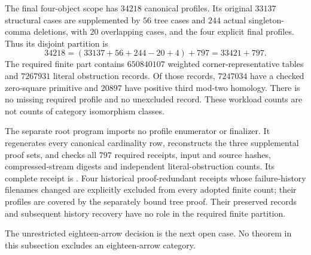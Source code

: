 The final four-object scope has $34218$ canonical profiles.
Its original $33137$ structural cases are supplemented
by $56$ tree cases and $244$ actual singleton-comma
deletions, with $20$ overlapping cases, and the four
explicit final profiles. Thus its disjoint partition is
\[
34218=(33137+56+244-20+4)+797=33421+797.
\]
The required finite part contains $650840107$ weighted
corner-representative tables and $7267931$ literal
obstruction records. Of those records, $7247034$ have
a checked zero-square primitive and $20897$ have positive
third mod-two homology. There is no missing required
profile and no unexcluded record. These workload counts
are not counts of category isomorphism classes.

The separate root program
 imports no profile
enumerator or finalizer. It regenerates every canonical
cardinality row, reconstructs the three supplemental proof
sets, and checks all $797$ required receipts, input and
source hashes, compressed-stream digests and independent
literal-obstruction counts. Its complete receipt is
. Four historical
proof-redundant receipts whose failure-history filenames
changed are explicitly excluded from every adopted finite
count; their profiles are covered by the separately bound
tree proof. Their preserved records and subsequent history
recovery have no role in the required finite partition.

The unrestricted eighteen-arrow decision is the next
open case. No theorem in this subsection excludes an
eighteen-arrow category.
